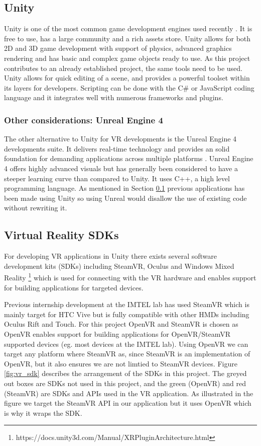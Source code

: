 \subsection{Unity}
\label{section: untiy}
Unity is one of the most common game development engines used recently \cite{unity}. It is free to use, has a large community and a rich assets store. Unity allows for both 2D and 3D game development with support of physics, advanced graphics rendering and has basic and complex game objects ready to use. As this project contributes to an already established project, the same tools need to be used. Unity allows for quick editing of a scene, and provides a powerful toolset within its layers for developers. Scripting can be done with the C\# or JavaScript coding language and it integrates well with numerous frameworks and plugins.

\subsubsection{Other considerations: Unreal Engine 4}
The other alternative to Unity for VR developments is the Unreal Engine 4 developments suite. It delivers real-time technology and provides an solid foundation for demanding applications across multiple platforms \cite{unrealEngine}. Unreal Engine 4 offers highly advanced visuals but has generally been considered to have a steeper learning curve than compared to Unity. It uses C++, a high level programming language. As mentioned in Section \ref{section: untiy} previous applications has been made using Unity so using Unreal would disallow the use of existing code without rewriting it.       

\subsection{Virtual Reality SDKs}
\label{section:sdks}
For developing VR applications in Unity there exists several software development kits (SDKs) including SteamVR, Oculus and Windows Mixed Reality \footnote{https://docs.unity3d.com/Manual/XRPluginArchitecture.html} which is used for connecting with the VR hardware and enables support for building applications for targeted devices.  

Previous internship development at the IMTEL lab has used SteamVR which is mainly target for HTC Vive but is fully compatible with other HMDs including Oculus Rift and Touch. For this project OpenVR and SteamVR is chosen as OpenVR enables support for building applications for OpenVR/SteamVR supported devices (eg. most devices at the IMTEL lab). Using OpenVR we can target any platform where SteamVR as, since SteamVR is an implementation of OpenVR, but it also ensures we are not limtied to SteamVR devices.  Figure \ref{fig:vr_sdk} describes the arrangement of the SDKs in this project. The greyed out boxes are SDKs not used in this project, and the green (OpenVR) and red (SteamVR) are SDKs and APIs used in the VR application. As illustrated in the figure we target the SteamVR API in our application but it uses OpenVR which is why it wraps the SDK.


